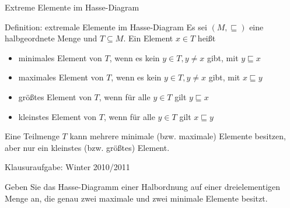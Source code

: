 \begin{frame}{Extreme Elemente im Hasse-Diagram}
    \begin{block}{Definition: extremale Elemente im Hasse-Diagram}
        Es sei $\left( M, \sqsubseteq \right)$ eine halbgeordnete Menge und $T\subseteq M$. Ein Element $x\in T$ heißt
        \begin{itemize}
            \item minimales Element von $T$, wenn es kein $y\in T, y\neq x$ gibt, mit $y\sqsubseteq x$
            \item maximales Element von $T$, wenn es kein $y\in T, y\neq x$ gibt, mit $x\sqsubseteq y$
            \item größtes Element von $T$, wenn für alle $y\in T$ gilt $y\sqsubseteq x$
            \item kleinstes Element von $T$, wenn für alle $y\in T$ gilt $x\sqsubseteq y$
        \end{itemize}
    \end{block}
    Eine Teilmenge $T$ kann mehrere minimale (bzw. maximale) Elemente besitzen, aber nur ein kleinstes (bzw. größtes) Element.
\end{frame}
\begin{frame}{Klausuraufgabe: Winter 2010/2011}
    \begin{exampleblock}{}
        Geben Sie das Hasse-Diagramm einer Halbordnung auf einer dreielementigen Menge an, die genau zwei maximale und zwei minimale Elemente besitzt.
    \end{exampleblock}
\end{frame}

